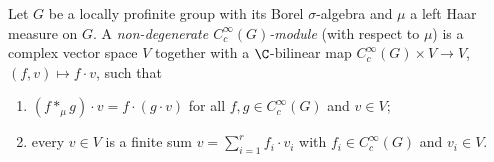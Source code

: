 Let $G$ be a locally profinite group with its Borel $\sigma$-algebra and $\mu$ a left Haar measure on $G$. A
\emph{non-degenerate $C_c^\infty(G)$-module} (with respect to $\mu$) is a complex vector space $V$ together with a
$\C$-bilinear map $C_c^\infty(G)\times V\to V$, $(f,v)\mapsto f\cdot v$, such that
\begin{enumerate}[label=(\roman*)]
\item $(f*_\mu g)\cdot v=f\cdot(g\cdot v)$ for all $f,g\in C_c^\infty(G)$ and $v\in V$;
\item every $v\in V$ is a finite sum $v=\sum_{i=1}^rf_i\cdot v_i$ with $f_i\in C_c^\infty(G)$ and $v_i\in V$.
\end{enumerate}
